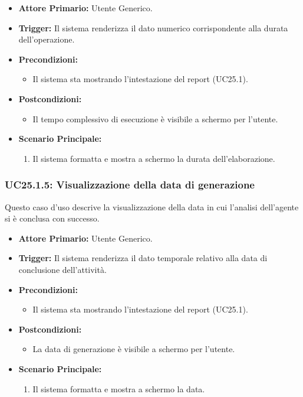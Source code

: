 \documentclass[12pt, a4paper]{article}
\begin{document}
\begin{itemize}
    \item \textbf{Attore Primario:} Utente Generico.
    \item \textbf{Trigger:} Il sistema renderizza il dato numerico corrispondente alla durata dell'operazione.
    \item \textbf{Precondizioni:}
    \begin{itemize}
        \item Il sistema sta mostrando l'intestazione del report (UC25.1).
    \end{itemize}
    \item \textbf{Postcondizioni:}
    \begin{itemize}
        \item Il tempo complessivo di esecuzione è visibile a schermo per l'utente.
    \end{itemize}
    \item \textbf{Scenario Principale:}
    \begin{enumerate}
        \item Il sistema formatta e mostra a schermo la durata dell'elaborazione.
    \end{enumerate}
\end{itemize}

\subsubsection{UC25.1.5: Visualizzazione della data di generazione}\label{uc:25.1.5}
Questo caso d'uso descrive la visualizzazione della data in cui l'analisi dell'agente si è conclusa con successo.

\begin{itemize}
    \item \textbf{Attore Primario:} Utente Generico.
    \item \textbf{Trigger:} Il sistema renderizza il dato temporale relativo alla data di conclusione dell'attività.
    \item \textbf{Precondizioni:}
    \begin{itemize}
        \item Il sistema sta mostrando l'intestazione del report (UC25.1).
    \end{itemize}
    \item \textbf{Postcondizioni:}
    \begin{itemize}
        \item La data di generazione è visibile a schermo per l'utente.
    \end{itemize}\newpage
    \item \textbf{Scenario Principale:}
    \begin{enumerate}
        \item Il sistema formatta e mostra a schermo la data.
    \end{enumerate}
\end{itemize}
\end{document}
